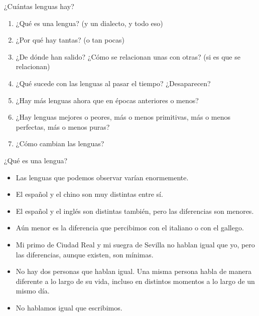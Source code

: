 \documentclass[handout]{beamer}
\begin{document}
\begin{frame}{¿Cuántas lenguas hay?}
\begin{enumerate}
	\item ¿Qué es una lengua? (y un dialecto, y todo eso)
	\item ¿Por qué hay tantas? (o tan pocas)
	\item ¿De dónde han salido? ¿Cómo se relacionan unas con otras? (si es que se relacionan)
	\item ¿Qué sucede con las lenguas al pasar el tiempo? ¿Desaparecen?
	\item ¿Hay más lenguas ahora que en épocas anteriores o menos?
	\item ¿Hay lenguas mejores o peores, más o menos primitivas, más o menos perfectas, más o menos puras?
	\item ¿Cómo cambian las lenguas?
\end{enumerate}
\end{frame}



\begin{frame}{¿Qué es una lengua?}

\begin{itemize}
	\item Las lenguas que podemos observar varían enormemente.
	\item El español y el chino son muy distintas entre sí. 
	\item El español y el inglés son distintas también, pero las diferencias son menores.
	\item Aún menor es la diferencia que percibimos con el italiano o con el gallego. 
	\item Mi primo de Ciudad Real y mi suegra de Sevilla no hablan igual que yo, pero las diferencias, aunque existen, son mínimas.
	\item No hay dos personas que hablan igual. Una misma persona habla de manera diferente a lo largo de su vida, incluso en distintos momentos a lo largo de un mismo día.
	\item No hablamos igual que escribimos.
\end{itemize}
\end{frame}
\end{document}
